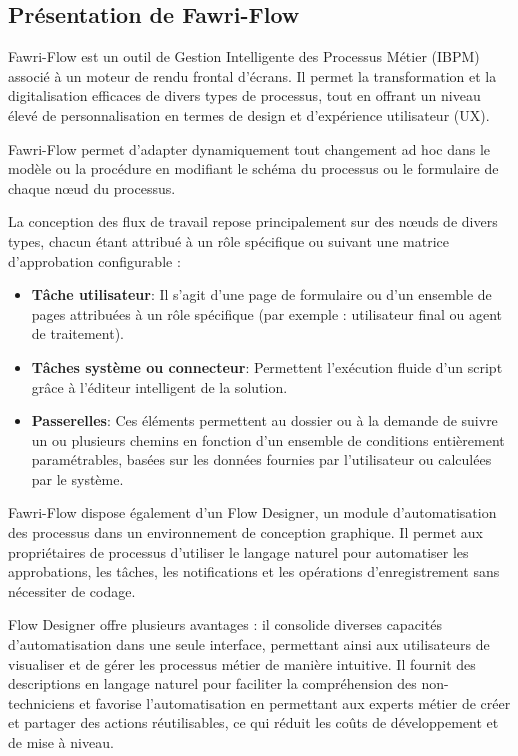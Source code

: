 \subsection{Présentation de Fawri-Flow}


\hspace{\parindent}Fawri-Flow est un outil de Gestion Intelligente des Processus Métier (IBPM) associé à un moteur de rendu frontal d'écrans. Il permet la transformation et la digitalisation efficaces de divers types de processus, tout en offrant un niveau élevé de personnalisation en termes de design et d'expérience utilisateur (UX).

Fawri-Flow permet d'adapter dynamiquement tout changement ad hoc dans le modèle ou la procédure en modifiant le schéma du processus ou le formulaire de chaque nœud du processus.

La conception des flux de travail repose principalement sur des nœuds de divers types, chacun étant attribué à un rôle spécifique ou suivant une matrice d'approbation configurable :

\begin{itemize}
    \item \textbf{Tâche utilisateur}: Il s'agit d'une page de formulaire ou d'un ensemble de pages attribuées à un rôle spécifique (par exemple : utilisateur final ou agent de traitement).

    \item \textbf{Tâches système ou connecteur}: Permettent l'exécution fluide d'un script grâce à l'éditeur intelligent de la solution.
    \item \textbf{Passerelles}: Ces éléments permettent au dossier ou à la demande de suivre un ou plusieurs chemins en fonction d'un ensemble de conditions entièrement paramétrables, basées sur les données fournies par l'utilisateur ou calculées par le système.
\end{itemize}

Fawri-Flow dispose également d'un Flow Designer, un module d'automatisation des processus dans un environnement de conception graphique. Il permet aux propriétaires de processus d'utiliser le langage naturel pour automatiser les approbations, les tâches, les notifications et les opérations d'enregistrement sans nécessiter de codage.

Flow Designer offre plusieurs avantages : il consolide diverses capacités d'automatisation dans une seule interface, permettant ainsi aux utilisateurs de visualiser et de gérer les processus métier de manière intuitive. Il fournit des descriptions en langage naturel pour faciliter la compréhension des non-techniciens et favorise l'automatisation en permettant aux experts métier de créer et partager des actions réutilisables, ce qui réduit les coûts de développement et de mise à niveau.

